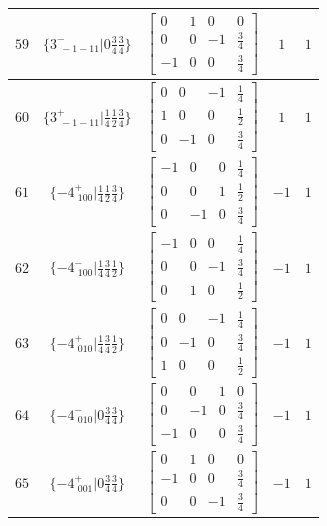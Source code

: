 \documentclass[fleqn,8pt]{jsarticle}
\begin{document}
\begin{longtable}{ccccc}
$ 59 $ & $ \{3^{-}_{\,\,-1-11}|0 \frac{3}{4} \frac{3}{4}\} $ & $ \begin{bmatrix} 0 & 1 & 0 & 0 \\ 0 & 0 & -1 & \frac{3}{4} \\ -1 & 0 & 0 & \frac{3}{4} \end{bmatrix} $ & $ 1 $ & $ 1 $ \\ \hline
$ 60 $ & $ \{3^{+}_{\,\,-1-11}|\frac{1}{4} \frac{1}{2} \frac{3}{4}\} $ & $ \begin{bmatrix} 0 & 0 & -1 & \frac{1}{4} \\ 1 & 0 & 0 & \frac{1}{2} \\ 0 & -1 & 0 & \frac{3}{4} \end{bmatrix} $ & $ 1 $ & $ 1 $ \\ \hline
$ 61 $ & $ \{-4^{+}_{\,\,100}|\frac{1}{4} \frac{1}{2} \frac{3}{4}\} $ & $ \begin{bmatrix} -1 & 0 & 0 & \frac{1}{4} \\ 0 & 0 & 1 & \frac{1}{2} \\ 0 & -1 & 0 & \frac{3}{4} \end{bmatrix} $ & $ -1 $ & $ 1 $ \\ \hline
$ 62 $ & $ \{-4^{-}_{\,\,100}|\frac{1}{4} \frac{3}{4} \frac{1}{2}\} $ & $ \begin{bmatrix} -1 & 0 & 0 & \frac{1}{4} \\ 0 & 0 & -1 & \frac{3}{4} \\ 0 & 1 & 0 & \frac{1}{2} \end{bmatrix} $ & $ -1 $ & $ 1 $ \\ \hline
$ 63 $ & $ \{-4^{+}_{\,\,010}|\frac{1}{4} \frac{3}{4} \frac{1}{2}\} $ & $ \begin{bmatrix} 0 & 0 & -1 & \frac{1}{4} \\ 0 & -1 & 0 & \frac{3}{4} \\ 1 & 0 & 0 & \frac{1}{2} \end{bmatrix} $ & $ -1 $ & $ 1 $ \\ \hline
$ 64 $ & $ \{-4^{-}_{\,\,010}|0 \frac{3}{4} \frac{3}{4}\} $ & $ \begin{bmatrix} 0 & 0 & 1 & 0 \\ 0 & -1 & 0 & \frac{3}{4} \\ -1 & 0 & 0 & \frac{3}{4} \end{bmatrix} $ & $ -1 $ & $ 1 $ \\ \hline
$ 65 $ & $ \{-4^{+}_{\,\,001}|0 \frac{3}{4} \frac{3}{4}\} $ & $ \begin{bmatrix} 0 & 1 & 0 & 0 \\ -1 & 0 & 0 & \frac{3}{4} \\ 0 & 0 & -1 & \frac{3}{4} \end{bmatrix} $ & $ -1 $ & $ 1 $ \\ \hline

\end{longtable}
\end{document}

